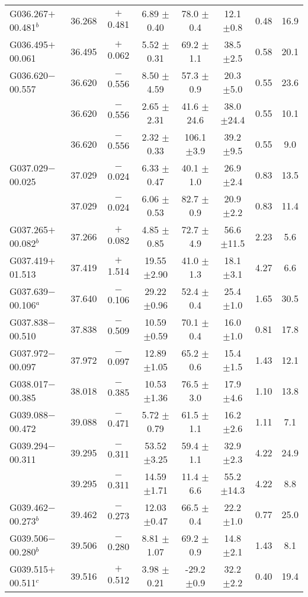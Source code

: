 \begin{ThreePartTable}
\begin{longtable}{lccccccc}
G036.267$+$00.481$^b$ &36.268&$+$0.481&6.89	$\pm$0.40&78.0	$\pm$0.4	&12.1	$\pm$0.8	&0.48	&16.9\\
G036.495$+$00.061     &36.495&$+$0.062&5.52	$\pm$0.31&69.2	$\pm$1.1	&38.5	$\pm$2.5	&0.58	&20.1\\
G036.620$-$00.557     &36.620&$-$0.556&8.50	$\pm$4.59&57.3	$\pm$0.9	&20.3	$\pm$5.0	&0.55	&23.6\\
                      &36.620&$-$0.556&2.65	$\pm$2.31&41.6	$\pm$24.6	&38.0	$\pm$24.4	&0.55	&10.1\\
                      &36.620&$-$0.556&2.32	$\pm$0.33&106.1	$\pm$3.9	&39.2	$\pm$9.5	&0.55	&9.0\\
G037.029$-$00.025     &37.029&$-$0.024&6.33	$\pm$0.47&40.1	$\pm$1.0	&26.9	$\pm$2.4	&0.83	&13.5\\
                      &37.029&$-$0.024&6.06	$\pm$0.53&82.7	$\pm$0.9	&20.9	$\pm$2.2	&0.83	&11.4\\
G037.265$+$00.082$^b$ &37.266&$+$0.082&4.85	$\pm$0.85&72.7	$\pm$4.9	&56.6	$\pm$11.5	&2.23	&5.6\\
G037.419$+$01.513     &37.419&$+$1.514&19.55	$\pm$2.90&41.0	$\pm$1.3	&18.1	$\pm$3.1	&4.27	&6.6\\
G037.639$-$00.106$^a$ &37.640&$-$0.106&29.22	$\pm$0.96&52.4	$\pm$0.4	&25.4	$\pm$1.0	&1.65	&30.5\\
G037.838$-$00.510     &37.838&$-$0.509&10.59	$\pm$0.59&70.1	$\pm$0.4	&16.0	$\pm$1.0	&0.81	&17.8\\
G037.972$-$00.097     &37.972&$-$0.097&12.89	$\pm$1.05&65.2	$\pm$0.6	&15.4	$\pm$1.5	&1.43	&12.1\\
G038.017$-$00.385     &38.018&$-$0.385&10.53	$\pm$1.36&76.5	$\pm$3.0	&17.9	$\pm$4.6	&1.10	&13.8\\
G039.088$-$00.472     &39.088&$-$0.471&5.72	$\pm$0.79&61.5	$\pm$1.1	&16.2	$\pm$2.6	&1.11	&7.1\\
G039.294$-$00.311     &39.295&$-$0.311&53.52	$\pm$3.25&59.4	$\pm$1.1	&32.9	$\pm$2.3	&4.22	&24.9\\
                      &39.295&$-$0.311&14.59	$\pm$1.71&11.4	$\pm$6.6	&55.2	$\pm$14.3	&4.22	&8.8\\
G039.462$-$00.273$^b$ &39.462&$-$0.273&12.03	$\pm$0.47&66.5	$\pm$0.4	&22.2	$\pm$1.0	&0.77	&25.0\\
G039.506$-$00.280$^b$ &39.506&$-$0.280&8.81	$\pm$1.07&69.2	$\pm$0.9	&14.8	$\pm$2.1	&1.43	&8.1\\
G039.515$+$00.511$^c$ &39.516&$+$0.512&3.98	$\pm$0.21&-29.2	$\pm$0.9	&32.2	$\pm$2.2	&0.40	&19.4\\

\end{longtable}
\end{ThreePartTable}
